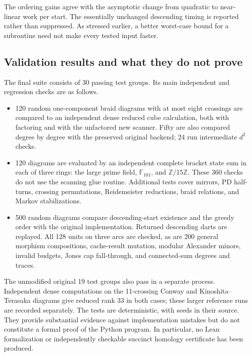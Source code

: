 \documentclass[11pt]{article}
\theoremstyle{definition}\newtheorem{definition}[theorem]{Definition}
\theoremstyle{remark}\newtheorem{remark}[theorem]{Remark}
\begin{document}

The ordering gains agree with the asymptotic change from quadratic to
near-linear work per start. The essentially unchanged descending timing is
reported rather than suppressed. As stressed earlier, a better worst-case
bound for a subroutine need not make every tested input faster.

\subsection{Validation results and what they do not prove}
The final suite consists of 30 passing test groups. Its main independent and
regression checks are as follows.
\begin{itemize}[itemsep=3pt]
\item 120 random one-component braid diagrams with at most eight crossings are
compared to an independent dense reduced cube calculation, both with factoring
and with the unfactored new scanner. Fifty are also compared degree by degree
with the preserved original backend; 24 run intermediate $d^2$ checks.
\item 120 diagrams are evaluated by an independent complete bracket state sum
in each of three rings: the large prime field, $\mathbb F_{101}$, and
$\mathbb Z/15\mathbb Z$. These 360 checks do not use the scanning glue routine.
Additional tests cover mirrors, PD half-turns, crossing permutations,
Reidemeister reductions, braid relations, and Markov stabilizations.
\item 500 random diagrams compare descending-start existence and the greedy
order with the original implementation. Returned descending darts are replayed.
All 128 units on three arcs are checked, as are 200 general morphism
compositions, cache-result mutation, modular Alexander minors, invalid budgets,
Jones cap fall-through, and connected-sum degrees and traces.
\end{itemize}
The unmodified original 19 test groups also pass in a separate process.
Independent dense computations on the 11-crossing Conway and Kinoshita--Terasaka
diagrams give reduced rank 33 in both cases; these larger reference runs are
recorded separately. The tests are deterministic, with seeds in their source.
They provide substantial evidence against implementation mistakes but do not
constitute a formal proof of the Python program. In particular, no Lean
formalization or independently checkable succinct homology certificate has
been produced.
\end{document}
